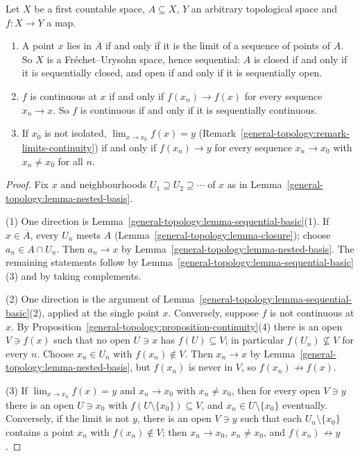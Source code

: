 \begin{proposition}\label{general-topology:proposition-first-countable-sequences}
Let $X$ be a first countable space, $A \subseteq X$, $Y$ an arbitrary topological space and $f \colon X \to Y$ a map.
\begin{enumerate}
\item A point $x$ lies in $\overline{A}$ if and only if it is the limit of a sequence of points of $A$. So $X$ is a Fr\'echet--Urysohn space, hence sequential: $A$ is closed if and only if it is sequentially closed, and open
if and only if it is sequentially open.
\item $f$ is continuous at $x$ if and only if $f(x_n) \to f(x)$ for every sequence $x_n \to x$. So $f$ is continuous if and only if it is sequentially continuous.
\item If $x_0$ is not isolated, $\lim_{x \to x_0}f(x) = y$ (Remark~\ref{general-topology:remark-limits-continuity}) if and only if $f(x_n) \to y$ for every sequence $x_n \to x_0$ with $x_n \neq x_0$ for all $n$.
\end{enumerate}
\end{proposition}

\begin{proof}
Fix $x$ and neighbourhoods $U_1 \supseteq U_2 \supseteq \cdots$ of $x$ as in Lemma~\ref{general-topology:lemma-nested-basis}.

(1) One direction is Lemma~\ref{general-topology:lemma-sequential-basic}(1). If $x \in \overline{A}$, every $U_n$ meets $A$ (Lemma~\ref{general-topology:lemma-closure}); choose $a_n \in A \cap U_n$. Then $a_n \to x$ by
Lemma~\ref{general-topology:lemma-nested-basis}. The remaining statements follow by Lemma~\ref{general-topology:lemma-sequential-basic}(3) and by taking complements.

(2) One direction is the argument of Lemma~\ref{general-topology:lemma-sequential-basic}(2), applied at the single point $x$. Conversely, suppose $f$ is not continuous at $x$. By
Proposition~\ref{general-topology:proposition-continuity}(4) there is an open $V \ni f(x)$ such that no open $U \ni x$ has $f(U) \subseteq V$; in particular $f(U_n) \not\subseteq V$ for every $n$. Choose $x_n \in U_n$
with $f(x_n) \notin V$. Then $x_n \to x$ by Lemma~\ref{general-topology:lemma-nested-basis}, but $f(x_n)$ is never in $V$, so $f(x_n) \not\to f(x)$.

(3) If $\lim_{x \to x_0}f(x) = y$ and $x_n \to x_0$ with $x_n \neq x_0$, then for every open $V \ni y$ there is an open $U \ni x_0$ with $f(U \setminus \{x_0\}) \subseteq V$, and $x_n \in U \setminus \{x_0\}$ eventually. Conversely, if the
limit is not $y$, there is an open $V \ni y$ such that each $U_n \setminus \{x_0\}$ contains a point $x_n$ with $f(x_n) \notin V$; then $x_n \to x_0$, $x_n \neq x_0$, and $f(x_n) \not\to y$.
\end{proof}

